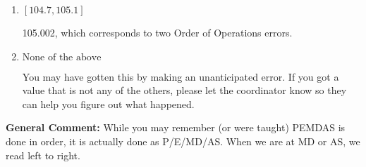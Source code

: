 \documentclass{extbook}[14pt]
\begin{document}
\begin{enumerate}
{\begin{enumerate}[label=\Alph*.]
 -94.998, which corresponds to an Order of Operations error: not reading left-to-right for multiplication/division.
\item \( [104.7, 105.1] \)

 105.002, which corresponds to two Order of Operations errors.
\item \( \text{None of the above} \)

 You may have gotten this by making an unanticipated error. If you got a value that is not any of the others, please let the coordinator know so they can help you figure out what happened.
\end{enumerate}

\textbf{General Comment:} While you may remember (or were taught) PEMDAS is done in order, it is actually done as P/E/MD/AS. When we are at MD or AS, we read left to right.
}
\end{enumerate}
\end{document}
